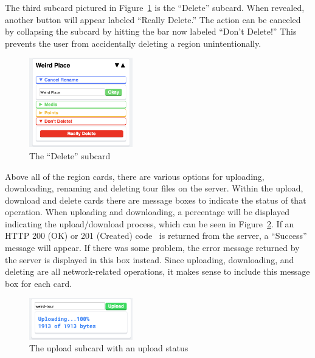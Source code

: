 \documentclass[a4paper, 10pt, american, titlepage]{article}
\begin{document}
The third subcard pictured in Figure~\ref{fig:deleteSubcard} is the ``Delete''
subcard. When revealed, another button will appear labeled ``Really Delete.''
The action can be canceled by collapsing the subcard by hitting the bar now
labeled ``Don't Delete!'' This prevents the user from accidentally deleting a
region unintentionally.

\begin{figure}[h]
	\centering
    \includegraphics[width=0.4\textwidth]{delete-subcard-editour.png}
    \caption{The ``Delete'' subcard}
	\label{fig:deleteSubcard}
\end{figure}

Above all of the region cards, there are various options for uploading,
downloading, renaming and deleting tour files on the server. Within the upload,
download and delete cards there are message boxes to indicate the status of
that operation. When uploading and downloading, a percentage will be displayed
indicating the upload/download process, which can be seen in
Figure~\ref{fig:uploadingMessage}. If an HTTP 200 (OK) or 201 (Created)
code~\autocite{rfc7231} is returned from the server, a ``Success'' message will
appear. If there was some problem, the error message returned by the server is
displayed in this box instead. Since uploading, downloading, and deleting are
all network-related operations, it makes sense to include this message box for
each card.

\begin{figure}[h]
	\centering
    \includegraphics[width=0.4\textwidth]{uploading-message-editour.png}
    \caption{The upload subcard with an upload status}
	\label{fig:uploadingMessage}
\end{figure}
\end{document}
